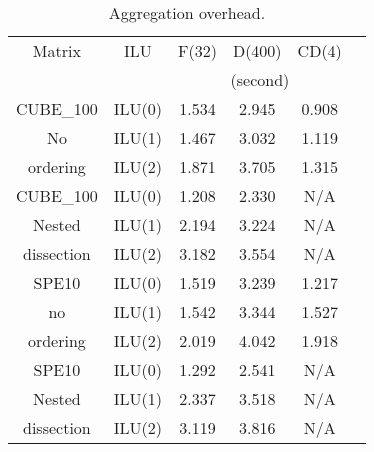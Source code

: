 \begin{table}[!h]
  \renewcommand{\arraystretch}{1.3}
  \caption{Aggregation overhead.}
  \label{agg_time}
  \centering
  \begin{tabular}{|c|c||c|c|c|c|}
    \hline
    Matrix & ILU & F(32) & D(400) & CD(4)\\
    &     &  \multicolumn{3}{c|}{(second)}\\
    \hline
    \hline
    \hline
    CUBE\_100  & ILU(0) & 1.534 & 2.945 & 0.908\\
    No         & ILU(1) & 1.467 & 3.032 & 1.119\\
    ordering   & ILU(2) & 1.871 & 3.705 & 1.315\\
    \hline
    CUBE\_100  & ILU(0) & 1.208 & 2.330 & N/A\\
    Nested     & ILU(1) & 2.194 & 3.224 & N/A\\
    dissection & ILU(2) & 3.182 & 3.554 & N/A\\
    \hline
    \hline
    SPE10      & ILU(0) & 1.519 & 3.239 & 1.217\\
    no         & ILU(1) & 1.542 & 3.344 & 1.527\\
    ordering   & ILU(2) & 2.019 & 4.042 & 1.918\\
    \hline
    SPE10      & ILU(0) & 1.292 & 2.541 & N/A\\
    Nested     & ILU(1) & 2.337 & 3.518 & N/A\\
    dissection & ILU(2) & 3.119 & 3.816 & N/A\\
    \hline
  \end{tabular}
\end{table}
